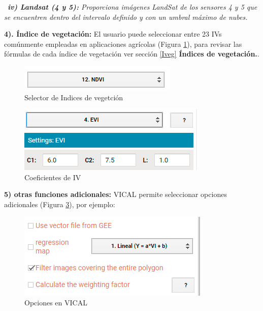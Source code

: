 \documentclass[
]{book}
\begin{document}
~\emph{\textbf{iv) Landsat (4 y 5):} Proporciona imágenes LandSat de los sensores 4 y 5 que se encuentren dentro del intervalo definido y con un umbral máximo de nubes.}

\textbf{4). Índice de vegetación: } El usuario puede seleccionar entre 23 IVs comúnmente empleadas en aplicaciones agrícolas (Figura \ref{fig:figG4}), para revisar las fórmulas de cada índice de vegetación ver sección \ref{Iveg} \textbf{Índices de vegetación.}.

\begin{figure}

{\centering \includegraphics{./images/Figure5} 

}

\caption{Selector de Indices de vegetción}\label{fig:figG4}
\end{figure}

\begin{figure}

{\centering \includegraphics{./images/Figure5.1} 

}

\caption{Coeficientes de IV}\label{fig:figG5}
\end{figure}

\textbf{5) otras funciones adicionales: } VICAL permite seleccionar opciones adicionales (Figura \ref{fig:figG6}), por ejemplo:

\begin{figure}

{\centering \includegraphics{./images/Figure9} 

}

\caption{Opciones en VICAL}\label{fig:figG6}
\end{figure}
\end{document}
